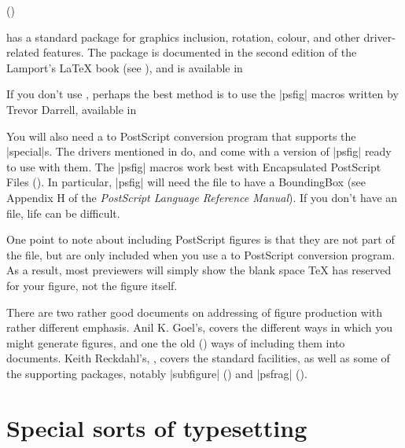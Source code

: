 
\htmlignore
\LaTeXe{} ()
\endhtmlignore
\begin{htmlversion}
\end{htmlversion}
has a standard package
for graphics inclusion, rotation, colour, and other driver-related
features. The package is documented in the second edition of the
Lamport's \LaTeX{} book
(see ), and is available
in 

If you don't use \LaTeXe{}, perhaps the best method is to use
the |psfig| macros written by Trevor Darrell, available in

You will also need a  to PostScript conversion program that
supports the \cs|special|s. The drivers mentioned in
 do, and come
with a version of |psfig| ready to use with them. The |psfig| macros
work best with Encapsulated PostScript Files (). In particular,
|psfig| will need the file to have a BoundingBox (see Appendix H of
the
\emph{PostScript Language Reference Manual}). If you don't have an 
file, life can be difficult.

One point to note about including PostScript figures is that they
are not part of the  file, but are only included when you
use a 
to PostScript conversion program. As a result, most  previewers
will simply show the blank space \TeX{} has reserved for your figure,
not the figure itself. 

There are two rather good documents on  addressing of figure
production with rather different emphasis.  Anil K. Goel's,
 covers the different ways in which you might
generate figures, and one the old (\LaTeXo{}) ways of including them
into documents.  Keith Reckdahl's, , covers the
standard \LaTeXe{} facilities, as well as some of the supporting
packages, notably \Package|subfigure| () and
\Package|psfrag| ().


\section{Special sorts of typesetting}


